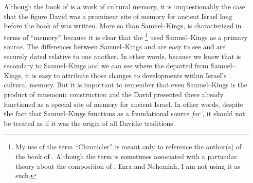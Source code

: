 Although the book of \chronicles is a work of cultural memory, it is unquestionably the case that the figure David was a prominent site of memory for ancient Israel long before the book of \chronicles was written. More so than Samuel--Kings, \chronicles is characterized in terms of ``memory'' because it is clear that the \chronicler%
    \footnote{My use of the term ``Chronicler'' is meant only to reference the author(s) of the book of \chronicles. Although the term is sometimes associated with a particular theory about the composition of \chronicles, Ezra and Nehemiah, I am not using it as such.}
used Samuel--Kings as a primary source. The differences between Samuel--Kings and \chronicles are easy to see and are securely dated relative to one another. In other words, because we know that \chronicles is secondary to Samuel--Kings and we can see where the \chronicler departed from Samuel--Kings, it is easy to attribute those changes to developments within Israel's cultural memory. But it is important to remember that even Samuel--Kings is the product of mnemonic construction and the David presented there already functioned as a special site of memory for ancient Israel. In other words, despite the fact that Samuel--Kings functions as a foundational source \emph{for \chronicles}, it should not be treated as if it was the origin of all Davidic traditions.\autocite{frohlich_frohlich2019}

